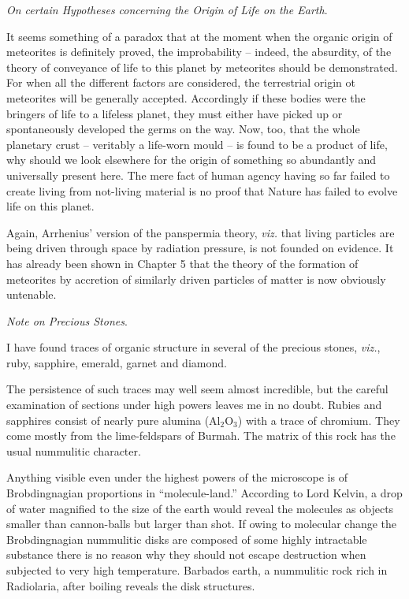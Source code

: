 \documentclass[a4paper, 12pt, oneside]{article}
\begin{document}
\emph{On certain Hypotheses concerning the Origin of Life on the Earth}.

It seems something of a paradox that at the moment when the organic origin of meteorites is definitely proved, the improbability -- indeed, the absurdity, of the theory of conveyance of life to this planet by meteorites should be demonstrated. For when all the different factors are considered, the terrestrial origin ot meteorites will be generally accepted. Accordingly if these bodies were the bringers of life to a lifeless planet, they must either have picked up or spontaneously developed the germs on the way. Now, too, that the whole planetary crust -- veritably a life-worn mould -- is found to be a product of life, why should we look elsewhere for the origin of something so abundantly and universally present here. The mere fact of human agency having so far failed to create living from not-living material is no proof that Nature has failed to evolve life on this planet.

Again, Arrhenius' version of the panspermia theory, \emph{viz.} that living particles are being driven through space by radiation pressure, is not founded on evidence. It has already been shown in Chapter 5 that the theory of the formation of meteorites by accretion of similarly driven particles of matter is now obviously untenable.

\emph{Note on Precious Stones}.

I have found traces of organic structure in several of the precious stones, \emph{viz.}, ruby, sapphire, emerald, garnet and diamond.

The persistence of such traces may well seem almost incredible, but the careful examination of sections under high powers leaves me in no doubt. Rubies and sapphires consist of nearly pure alumina (Al$_{2}$O$_{3}$) with a trace of chromium. They come mostly from the lime-feldspars of Burmah. The matrix of this rock has the usual nummulitic character.

Anything visible even under the highest powers of the microscope is of Brobdingnagian proportions in ``molecule-land.'' According to Lord Kelvin, a drop of water magnified to the size of the earth would reveal the molecules as objects smaller than cannon-balls but larger than shot. If owing to molecular change the Brobdingnagian nummulitic disks are composed of some highly intractable substance there is no reason why they should not escape destruction when subjected to very high temperature. Barbados earth, a nummulitic rock rich in Radiolaria, after boiling reveals the disk structures.
\end{document}

